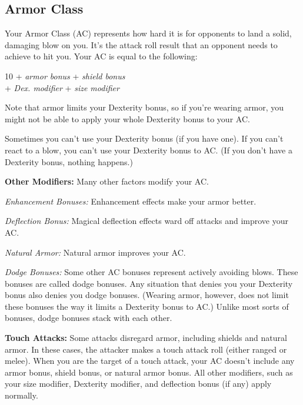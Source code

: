 \subsection{Armor Class}
Your Armor Class (AC) represents how hard it is for opponents to land a solid, damaging blow on you. It's the attack roll result that an opponent needs to achieve to hit you. Your AC is equal to the following:


\begin{Formula}{
	10 + \textit{armor bonus} + \textit{shield bonus}\\
	+ \textit{Dex. modifier} + \textit{size modifier}
}
\end{Formula}

Note that armor limits your Dexterity bonus, so if you're wearing armor, you might not be able to apply your whole Dexterity bonus to your AC.

Sometimes you can't use your Dexterity bonus (if you have one). If you can't react to a blow, you can't use your Dexterity bonus to AC. (If you don't have a Dexterity bonus, nothing happens.)

\textbf{Other Modifiers:} Many other factors modify your AC.

\textit{Enhancement Bonuses:} Enhancement effects make your armor better.

\textit{Deflection Bonus:} Magical deflection effects ward off attacks and improve your AC.

\textit{Natural Armor:} Natural armor improves your AC.

\textit{Dodge Bonuses:} Some other AC bonuses represent actively avoiding blows. These bonuses are called dodge bonuses. Any situation that denies you your Dexterity bonus also denies you dodge bonuses. (Wearing armor, however, does not limit these bonuses the way it limits a Dexterity bonus to AC.) Unlike most sorts of bonuses, dodge bonuses stack with each other.

\textbf{Touch Attacks:} Some attacks disregard armor, including shields and natural armor. In these cases, the attacker makes a touch attack roll (either ranged or melee). When you are the target of a touch attack, your AC doesn't include any armor bonus, shield bonus, or natural armor bonus. All other modifiers, such as your size modifier, Dexterity modifier, and deflection bonus (if any) apply normally.